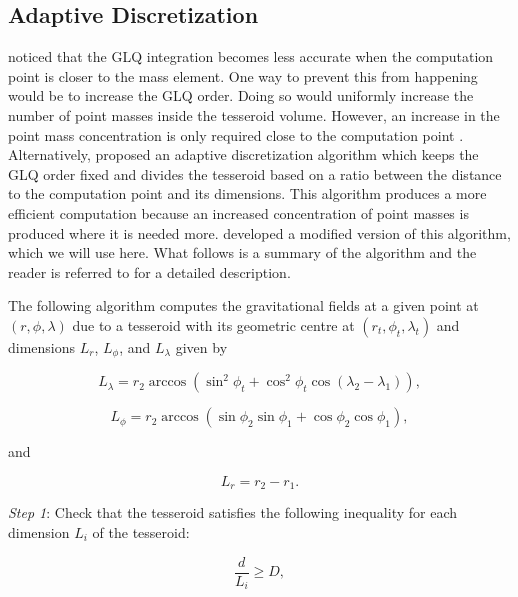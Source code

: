 \documentclass[extra, referee]{gji}
\begin{document}
\subsection{Adaptive Discretization}

\citet{Ku1977} noticed that the GLQ integration
becomes less accurate when the computation point is closer to the
mass element.
One way to prevent this from happening would be to increase the GLQ order.
Doing so would uniformly increase the number of point masses inside the
tesseroid volume.
However, an increase in the point mass concentration is only required close to the
computation point \citep{Uieda2016}.
Alternatively, \citet{Li2011} proposed an adaptive
discretization algorithm which keeps the GLQ order fixed and divides the
tesseroid based on a ratio between the distance to the computation
point and its dimensions.
This algorithm produces a more efficient computation because an increased concentration
of point masses is produced where it is needed more.
\citet{Uieda2016} developed a modified version of this algorithm, which we will use
here.
What follows is a summary of the algorithm and the reader is referred to
\citet{Uieda2016} for a detailed description.

The following algorithm computes the gravitational fields at a given point at $(r, \phi,
\lambda)$ due to a tesseroid with its geometric centre at $(r_t, \phi_t, \lambda_t)$ and
dimensions $L_r$, $L_\phi$, and $L_\lambda$ given by

\begin{equation}
    L_\lambda = r_2 \arccos(\sin^2\phi_t +
        \cos^2\phi_t\cos(\lambda_2 - \lambda_1)),
    \label{eq:sizelon}
\end{equation}

\begin{equation}
    L_\phi = r_2 \arccos(\sin\phi_2\sin\phi_1 + \cos\phi_2\cos\phi_1),
\end{equation}

and

\begin{equation}
    L_r = r_2 - r_1.
    \label{eq:sizer}
\end{equation}

\textit{Step 1}: Check that the tesseroid satisfies the following inequality for each
dimension $L_i$ of the tesseroid:

\begin{equation}
    \frac{d}{L_i} \geq D,
    \label{eq:condition}
\end{equation}
\end{document}
